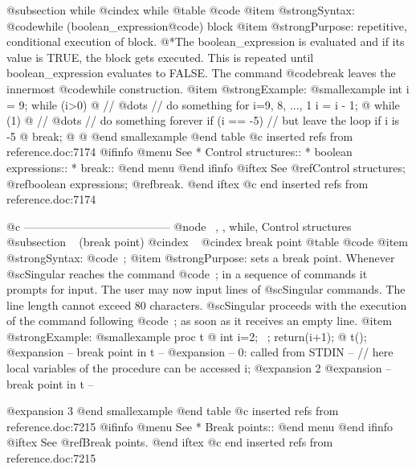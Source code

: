 {{{{{{{{@subsection while
@cindex while
@table @code
@item @strong{Syntax:}
@code{while (}boolean_expression@code{)} block
@item @strong{Purpose:}
repetitive, conditional execution of block.
@*The boolean_expression is evaluated and if its value is TRUE, the
block gets executed. This is repeated until boolean_expression evaluates
to FALSE.  The command @code{break} leaves the innermost @code{while}
construction.
@item @strong{Example:}
@smallexample
int i = 9;
while (i>0)
@{
   // @dots{} // do something for i=9, 8, ..., 1
   i = i - 1;
@}
while (1)
@{
   // @dots{}   // do something forever
   if (i == -5) // but leave the loop if i is -5
   @{
     break;
   @}
@}
@end smallexample
@end table
@c inserted refs from reference.doc:7174
@ifinfo
@menu
See
* Control structures::
* boolean expressions::
* break::
@end menu
@end ifinfo
@iftex
See
@ref{Control structures};
@ref{boolean expressions};
@ref{break}.
@end iftex
@c end inserted refs from reference.doc:7174

@c ---------------------------------------
@node ~, , while, Control structures
@subsection ~ (break point)
@cindex ~
@cindex break point
@table @code
@item @strong{Syntax:}
@code{~;}
@item @strong{Purpose:}
sets a break point. Whenever @sc{Singular} reaches the command @code{~;}
in a sequence of commands it prompts for input. The user may now input
lines of @sc{Singular} commands. The line length cannot exceed 80
characters.
@sc{Singular} proceeds with the execution of the command following @code{~;}
as soon as it receives an empty line.
@item @strong{Example:}
@smallexample
proc t
@{
  int i=2;
  ~;
  return(i+1);
@}
t();
@expansion{} -- break point in t --
@expansion{} -- 0: called    from STDIN --
// here local variables of the procedure can be accessed
i;
@expansion{} 2
@expansion{} -- break point in t --

@expansion{} 3
@end smallexample
@end table
@c inserted refs from reference.doc:7215
@ifinfo
@menu
See
* Break points::
@end menu
@end ifinfo
@iftex
See
@ref{Break points}.
@end iftex
@c end inserted refs from reference.doc:7215

}}}}}}}}
